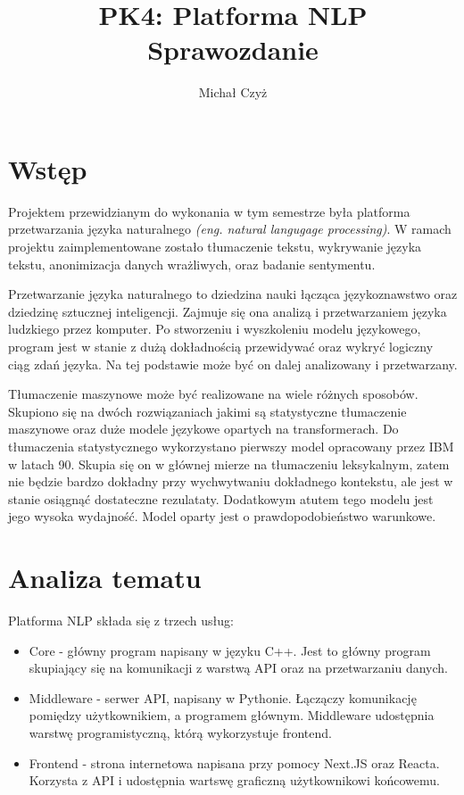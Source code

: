 \documentclass{article}
\title{%
  PK4: Platforma NLP \\
  \large Sprawozdanie}
\author{Michał Czyż}
\begin{document}
\maketitle

\section{Wstęp}

Projektem przewidzianym do wykonania w tym semestrze była platforma przetwarzania języka naturalnego \textit{(eng. natural langugage processing)}. W ramach projektu zaimplementowane zostało tłumaczenie tekstu, wykrywanie języka tekstu, anonimizacja danych wrażliwych, oraz badanie sentymentu. 

Przetwarzanie języka naturalnego to dziedzina nauki łącząca językoznawstwo oraz dziedzinę sztucznej inteligencji. Zajmuje się ona analizą i przetwarzaniem języka ludzkiego przez komputer. Po stworzeniu i wyszkoleniu modelu językowego, program jest w stanie z dużą dokładnością przewidywać oraz wykryć logiczny ciąg zdań języka. Na tej podstawie może być on dalej analizowany i przetwarzany.

Tłumaczenie maszynowe może być realizowane na wiele różnych sposobów. Skupiono się na dwóch rozwiązaniach jakimi są statystyczne tłumaczenie maszynowe oraz duże modele językowe opartych na transformerach. Do tłumaczenia statystycznego wykorzystano pierwszy model opracowany przez IBM w latach 90. Skupia się on w głównej mierze na tłumaczeniu leksykalnym, zatem nie będzie bardzo dokładny przy wychwytwaniu dokładnego kontekstu, ale jest w stanie osiągnąć dostateczne rezulataty. Dodatkowym atutem tego modelu jest jego wysoka wydajność. Model oparty jest o prawdopodobieństwo warunkowe.

\section{Analiza tematu}

Platforma NLP składa się z trzech usług:

\begin{itemize}
  \item Core - główny program napisany w języku C++. Jest to główny program skupiający się na komunikacji z warstwą API oraz na przetwarzaniu danych.
  \item Middleware - serwer API, napisany w Pythonie. Łączączy komunikację pomiędzy użytkownikiem, a programem głównym. Middleware udostępnia warstwę programistyczną, którą wykorzystuje frontend.
  \item Frontend - strona internetowa napisana przy pomocy Next.JS oraz Reacta. Korzysta z API i udostępnia wartswę graficzną użytkownikowi końcowemu.
\end{itemize}
\end{document}
